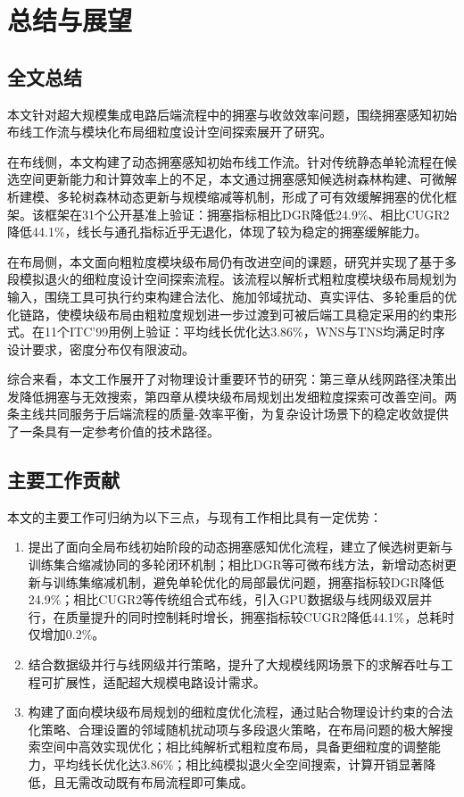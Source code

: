 \chapter{总结与展望}
\label{cha:conclusion}

\section{全文总结}

本文针对超大规模集成电路后端流程中的拥塞与收敛效率问题，围绕拥塞感知初始布线工作流与模块化布局细粒度设计空间探索展开了研究。

在布线侧，本文构建了动态拥塞感知初始布线工作流。针对传统静态单轮流程在候选空间更新能力和计算效率上的不足，本文通过拥塞感知候选树森林构建、可微解析建模、多轮树森林动态更新与规模缩减等机制，形成了可有效缓解拥塞的优化框架。该框架在31个公开基准上验证：拥塞指标相比DGR降低24.9\%、相比CUGR2降低44.1\%，线长与通孔指标近乎无退化，体现了较为稳定的拥塞缓解能力。

在布局侧，本文面向粗粒度模块级布局仍有改进空间的课题，研究并实现了基于多段模拟退火的细粒度设计空间探索流程。该流程以解析式粗粒度模块级布局规划为输入，围绕工具可执行约束构建合法化、施加邻域扰动、真实评估、多轮重启的优化链路，使模块级布局由粗粒度规划进一步过渡到可被后端工具稳定采用的约束形式。在11个ITC'99用例上验证：平均线长优化达3.86\%，WNS与TNS均满足时序设计要求，密度分布仅有限波动。

综合来看，本文工作展开了对物理设计重要环节的研究：第三章从线网路径决策出发降低拥塞与无效搜索，第四章从模块级布局规划出发细粒度探索可改善空间。两条主线共同服务于后端流程的质量-效率平衡，为复杂设计场景下的稳定收敛提供了一条具有一定参考价值的技术路径。

\section{主要工作贡献}

本文的主要工作可归纳为以下三点，与现有工作相比具有一定优势：
\begin{enumerate}
	\item 提出了面向全局布线初始阶段的动态拥塞感知优化流程，建立了候选树更新与训练集合缩减协同的多轮闭环机制；相比DGR等可微布线方法，新增动态树更新与训练集缩减机制，避免单轮优化的局部最优问题，拥塞指标较DGR降低24.9\%；相比CUGR2等传统组合式布线，引入GPU数据级与线网级双层并行，在质量提升的同时控制耗时增长，拥塞指标较CUGR2降低44.1\%，总耗时仅增加0.2\%。
	\item 结合数据级并行与线网级并行策略，提升了大规模线网场景下的求解吞吐与工程可扩展性，适配超大规模电路设计需求。
	\item 构建了面向模块级布局规划的细粒度优化流程，通过贴合物理设计约束的合法化策略、合理设置的邻域随机扰动项与多段退火策略，在布局问题的极大解搜索空间中高效实现优化；相比纯解析式粗粒度布局，具备更细粒度的调整能力，平均线长优化达3.86\%；相比纯模拟退火全空间搜索，计算开销显著降低，且无需改动既有布局流程即可集成。
\end{enumerate}

